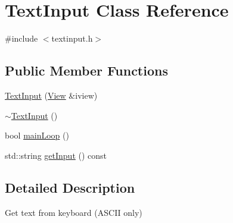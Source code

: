 \hypertarget{class_text_input}{\section{Text\-Input Class Reference}
\label{class_text_input}
}


{\ttfamily \#include $<$textinput.\-h$>$}

\subsection*{Public Member Functions}
\begin{DoxyCompactItemize}
\item 
\hyperlink{class_text_input_a3fe900efe9d41bf3d5e5d6acb5ac59d9}{Text\-Input} (\hyperlink{class_view}{View} \&iview)
\item 
\hyperlink{class_text_input_aa10eb8c9c85a5ebb7812ee441909c9e6}{$\sim$\-Text\-Input} ()
\item 
bool \hyperlink{class_text_input_a029a5ab670c9358c5165213e0966b344}{main\-Loop} ()
\item 
std\-::string \hyperlink{class_text_input_a0c4c73e5fe82d9987e4ba301b5153d28}{get\-Input} () const 
\end{DoxyCompactItemize}


\subsection{Detailed Description}
Get text from keyboard (A\-S\-C\-I\-I only) 


